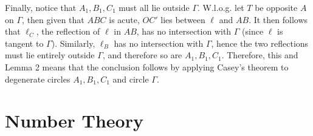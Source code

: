 \documentclass[11pt,a4paper]{article}
\begin{document}
\begin{enumerate}
	Finally, notice that $A_1, B_1, C_1$ must all lie outside $\Gamma$. 
	W.l.o.g. let $T$ be opposite $A$ on $\Gamma$, 
	then given that $ABC$ is acute, 
	$OC'$ lies between $\ell$ and $AB$. 
	It then follows that $\ell_C$, the reflection of $\ell$ in $AB$, 
	has no intersection with $\Gamma$ (since $\ell$ is tangent to $\Gamma$). 
	Similarly, $\ell_B$ has no intersection with $\Gamma$, hence the two reflections 
	must lie entirely outside $\Gamma$, and therefore so are $A_1, B_1, C_1$. 
	Therefore, this and Lemma 2 means that the conclusion follows 
	 by applying Casey's theorem to degenerate circles $A_1, B_1, C_1$ and circle $\Gamma$. 

	
\end{enumerate}

\section*{Number Theory}
\end{document}
